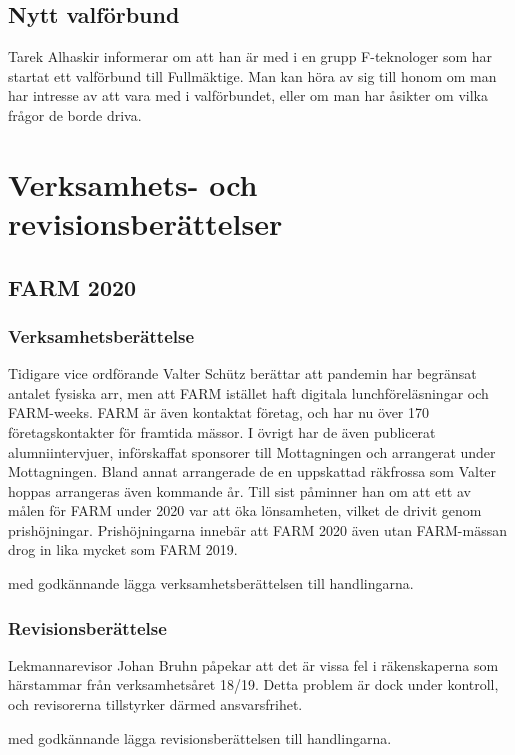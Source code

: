 \documentclass[hidelinks]{sektionsmote}
\begin{document}
\subsection{Nytt valförbund}
Tarek Alhaskir informerar om att han är med i en grupp F-teknologer som har startat ett valförbund till Fullmäktige.
Man kan höra av sig till honom om man har intresse av att vara med i valförbundet, eller om man har åsikter om vilka frågor de borde driva.


\section{Verksamhets- och revisionsberättelser}
\subsection{FARM 2020}
\subsubsection{Verksamhetsberättelse}
Tidigare vice ordförande Valter Schütz berättar att pandemin har begränsat antalet fysiska arr, men att FARM istället haft digitala lunchföreläsningar och FARM-weeks.
FARM är även kontaktat företag, och har nu över 170 företagskontakter för framtida mässor.
I övrigt har de även publicerat alumniintervjuer, införskaffat sponsorer till Mottagningen och arrangerat under Mottagningen.
Bland annat arrangerade de en uppskattad räkfrossa som Valter hoppas arrangeras även kommande år.
Till sist påminner han om att ett av målen för FARM under 2020 var att öka lönsamheten, vilket de drivit genom prishöjningar.
Prishöjningarna innebär att FARM 2020 även utan FARM-mässan drog in lika mycket som FARM 2019.

\begin{beslut}
  \item med godkännande lägga verksamhetsberättelsen till handlingarna.
\end{beslut}


\subsubsection{Revisionsberättelse}
Lekmannarevisor Johan Bruhn påpekar att det är vissa fel i räkenskaperna som härstammar från verksamhetsåret 18/19.
Detta problem är dock under kontroll, och revisorerna tillstyrker därmed ansvarsfrihet.

\begin{beslut}
  \item med godkännande lägga revisionsberättelsen till handlingarna.%
\end{beslut}
\end{document}

